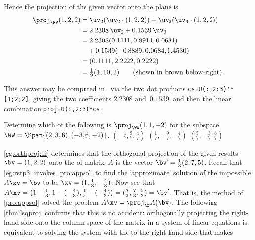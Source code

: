 \begin{example}
\begin{enumerate}[ref=\ref{eg:orthproj}(\alph*)]
\begin{solution}
Hence the projection of the given vector onto the plane is
\begin{align*}
\proj_\PP(1,2,2)
&=\uv_2(\uv_2\cdot(1,2,2))+\uv_3(\uv_3\cdot(1,2,2))
\\&=2.2308\,\uv_2+0.1539\,\uv_3
\\&=2.2308(0.1111,0.9914,0.0684)
\\&\quad{}+0.1539(-0.8889,0.0684,0.4530)
\\&=(0.1111,2.2222,0.2222)
\\&=\tfrac19(1,10,2)
\qquad(\text{shown in brown below-right}).
\end{align*}
\begin{figbox}[\vspace{1\baselineskip}]{}%
This answer may be computed in \script\ via the two dot products \verb|cs=U(:,2:3)'*[1;2;2]|, giving the two coefficients \(2.2308\) and~\(0.1539\), and then the linear combination \verb|proj=U(:,2:3)*cs|\,.
\end{figbox}

\end{solution}
\end{enumerate}
\end{example}



\begin{activity}
Determine which of the following is \(\proj_\WW(1,1,-2)\) for the subspace \(\WW=\Span\{(2,3,6), (-3,6,-2)\}\).
{\((-\frac17,\frac97,\frac47)\)}
{\((\frac17,-\frac97,-\frac47)\)}
{\((\frac57,-\frac37,\frac87)\)}
\end{activity}




\cref{eg:orthproj:iii} determines that the orthogonal projection of the given  results \(\bv=(1,2,2)\) onto the  of matrix~\(A\) is the vector \(\bv'=\tfrac13(2,7,5)\).
Recall that \cref{eg:rstp3} invokes \cref{pro:appsol} to find the `approximate' solution of the impossible \(A\xv=\bv\) to be \(\xv=(1,\frac13,-\frac43)\).
Now see that \(A\xv
=\big(1-\frac13,1-(-\frac43),\frac13-(-\frac43)\big)
=(\frac23,\frac73,\frac53)
=\bv'\).
That is, the  method of \cref{pro:appsol} solved the problem \(A\xv=\proj_\AA(\bv)\).
The following \cref{thm:lsqproj} confirms that this is no accident: orthogonally projecting the right-hand side onto the column space of the matrix in a system of linear equations is equivalent to solving the system with the  to the right-hand side that makes 


